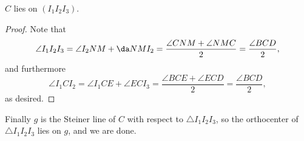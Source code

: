 \begin{claim}
    $C$ lies on $(I_1I_2I_3)$.
\end{claim}
\begin{proof}
    Note that \[\angle I_1I_2I_3=\angle I_2NM+\da NMI_2=\frac{\angle CNM+\angle NMC}2=\frac{\angle BCD}2,\]
    and furthermore \[\angle I_1CI_2=\angle I_1CE+\angle ECI_3=\frac{\angle BCE+\angle ECD}2=\frac{\angle BCD}2,\]
    as desired.
\end{proof}

Finally $g$ is the Steiner line of $C$ with respect to $\triangle I_1I_2I_3$, so the orthocenter of $\triangle I_1I_2I_3$ lies on $g$, and we are done.
